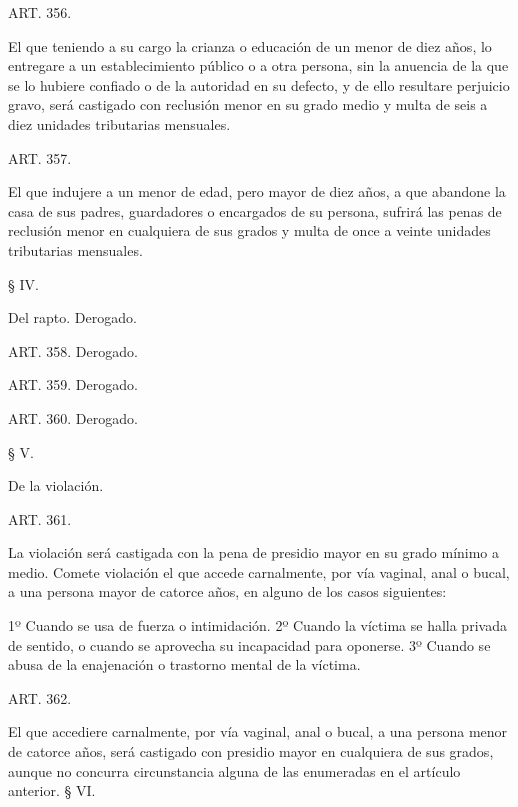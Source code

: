     ART. 356.

    El que teniendo a su cargo la crianza o educación de un menor de diez años, lo entregare a un establecimiento público o a otra persona, sin la anuencia de la que se lo hubiere confiado o de la autoridad en su defecto, y de ello resultare perjuicio gravo, será castigado con reclusión menor en su grado medio y multa de seis a diez unidades tributarias mensuales.









    ART. 357.

    El que indujere a un menor de edad, pero mayor de diez años, a que abandone la casa de sus padres, guardadores o encargados de su persona, sufrirá las penas de reclusión menor en cualquiera de sus grados y multa de once a veinte unidades tributarias mensuales.








    § IV.

    Del rapto. Derogado.




    ART. 358.    Derogado.

    ART. 359.    Derogado.

    ART. 360.    Derogado.



    § V.

    De la violación.




    ART. 361.

    La violación será castigada con la pena de presidio mayor en su grado mínimo a medio.
    Comete violación el que accede carnalmente, por vía vaginal, anal o bucal, a una persona mayor de catorce años, en alguno de los casos siguientes:

    1º Cuando se usa de fuerza o intimidación.
    2º Cuando la víctima se halla privada de sentido, o cuando se aprovecha su incapacidad para oponerse.
    3º Cuando se abusa de la enajenación o trastorno mental de la víctima.

    ART. 362.

    El que accediere carnalmente, por vía vaginal, anal o bucal, a una persona menor de catorce años, será castigado con presidio mayor en cualquiera de sus grados, aunque no concurra circunstancia alguna de las enumeradas en el artículo anterior.
    § VI.

